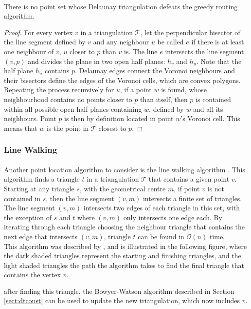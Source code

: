 \paragraph{}
\begin{theorem}
\cite{greedyroute}
There is no point set whose Delaunay triangulation defeats the greedy routing algorithm.
\begin{proof}
For every vertex $v$ in a triangulation $\mathcal{T}$, let the perpendicular bisector of the line segment defined by $v$ and any neighbour $u$ be called $e$ if there is at least one neighbour of $v$, $u$ closer to $p$ than $v$ is. The line $e$ intersects the line segment $(v,p)$ and divides the plane in two open half planes: $h_v$ and $h_u$. Note that the half plane $h_u$ contains $p$. Delaunay edges connect the Voronoi neighbours and their bisectors define the edges of the Voronoi cells, which are convex polygons. Repeating the process recursively for $u$, if a point $w$ is found, whose neighbourhood contains no points closer to $p$ than itself, then $p$ is contained within all possible open half planes containing $w$, defined by $w$ and all its neighbours. Point $p$ is then by definition located in point $w$'s Voronoi cell. This means that $w$ is the point in $\mathcal{T}$ closest to $p$.
\end{proof}
\end{theorem}
\subsubsection*{Line Walking}
\paragraph{}
Another point location algorithm to consider is the line walking algorithm \cite{walking}. This algorithm finds a triangle $t$ in a triangulation $\mathcal{T}$ that contains a given point $v$. 
Starting at any triangle $s$, with the geometrical centre $m$, if point $v$ is not contained in $s$, then the line segment $(v,m)$ intersects a finite set of triangles.  
The line segment $(v,m)$ intersects two edges of each triangle in this set, with the exception of $s$ and $t$ where $(v,m)$ only intersects one edge each. 
By iterating through each triangle choosing the neighbour triangle that contains the next edge that intersects $(v,m)$, triangle $t$ can be found in $\mathcal{O}(n)$ time.\\
This algorithm was described by \citet{walking}, and is illustrated in the following figure, where the dark shaded triangles represent the starting and finishing triangles, and the light shaded triangles the path the algorithm takes to find the final triangle that contains the vertex $v$.

after finding this triangle, the Bowyer-Watson algorithm described in Section \ref{sect:dtconst} can be used to update the new triangulation, which now includes $v$.
